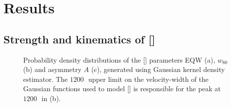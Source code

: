 \section{Results}

\subsection{Strength and kinematics of []}
\label{sec:ch4-basicresults}

\begin{figure}
    \captionsetup[subfigure]{labelformat=empty}
    \centering
    \subfloat[\label{fig:parameter_hists_a}]{}
    \subfloat[\label{fig:parameter_hists_b}]{}
    \subfloat[\label{fig:parameter_hists_c}]{}
    \caption[{Probability density distributions of the [] parameters EQW (a), $w_{80}$ (b) and asymmetry $A$ (c).}]{Probability density distributions of the [] parameters EQW (a), $w_{80}$ (b) and asymmetry $A$ (c), generated using Gaussian kernel density estimator. The $1200$\,\kms\, upper limit on the velocity-width of the Gaussian functions used to model [] is responsible for the peak at $1200$\,\kms\, in (b).}     
    \label{fig:parameter_hists}
\end{figure}

